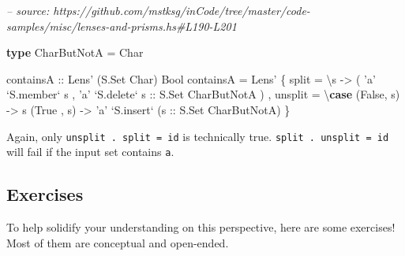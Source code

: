 \documentclass[]{article}
\newenvironment{Shaded}{}{}
\newcommand{\CharTok}[1]{\textcolor[rgb]{0.25,0.44,0.63}{#1}}
\newcommand{\CommentTok}[1]{\textcolor[rgb]{0.38,0.63,0.69}{\textit{#1}}}
\newcommand{\DataTypeTok}[1]{\textcolor[rgb]{0.56,0.13,0.00}{#1}}
\newcommand{\FunctionTok}[1]{\textcolor[rgb]{0.02,0.16,0.49}{#1}}
\newcommand{\KeywordTok}[1]{\textcolor[rgb]{0.00,0.44,0.13}{\textbf{#1}}}
\newcommand{\NormalTok}[1]{#1}
\newcommand{\OtherTok}[1]{\textcolor[rgb]{0.00,0.44,0.13}{#1}}
\begin{document}
\begin{Shaded}
\begin{Highlighting}[]
\CommentTok{-- source: https://github.com/mstksg/inCode/tree/master/code-samples/misc/lenses-and-prisms.hs#L190-L201}

\KeywordTok{type} \DataTypeTok{CharButNotA} \FunctionTok{=} \DataTypeTok{Char}

\OtherTok{containsA ::} \DataTypeTok{Lens'}\NormalTok{ (}\DataTypeTok{S.Set} \DataTypeTok{Char}\NormalTok{) }\DataTypeTok{Bool}
\NormalTok{containsA }\FunctionTok{=} \DataTypeTok{Lens'}
\NormalTok{    \{ split   }\FunctionTok{=}\NormalTok{ \textbackslash{}s }\OtherTok{->}
\NormalTok{        ( }\CharTok{'a'} \OtherTok{`S.member`}\NormalTok{ s}
\NormalTok{        , }\CharTok{'a'} \OtherTok{`S.delete` s      ::} \DataTypeTok{S.Set} \DataTypeTok{CharButNotA}
\NormalTok{        )}
\NormalTok{    , unsplit }\FunctionTok{=}\NormalTok{ \textbackslash{}}\KeywordTok{case}
\NormalTok{        (}\DataTypeTok{False}\NormalTok{, s) }\OtherTok{->}\NormalTok{ s}
\NormalTok{        (}\DataTypeTok{True}\NormalTok{ , s) }\OtherTok{->} \CharTok{'a'} \OtherTok{`S.insert`}\NormalTok{ (}\OtherTok{s ::} \DataTypeTok{S.Set} \DataTypeTok{CharButNotA}\NormalTok{)}
\NormalTok{    \}}
\end{Highlighting}
\end{Shaded}

Again, only \texttt{unsplit\ .\ split\ =\ id} is technically true.
\texttt{split\ .\ unsplit\ =\ id} will fail if the input set contains
\texttt{\textquotesingle{}a\textquotesingle{}}.

\hypertarget{exercises}{%
\subsection{Exercises}\label{exercises}}

To help solidify your understanding on this perspective, here are some
exercises! Most of them are conceptual and open-ended.
\end{document}
